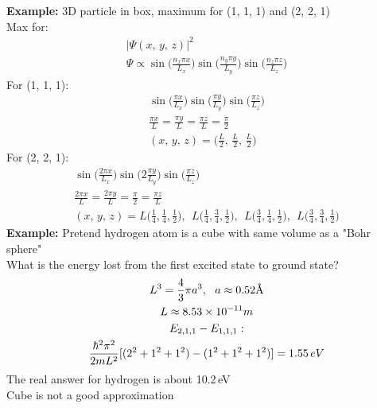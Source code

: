 \documentclass[a4paper, 11pt, fleqn, normalem]{report}
\begin{document}
\textbf{Example: }3D particle in box, maximum for (1, 1, 1) and (2, 2, 1) \\
Max for:
\begin{gather*}
    |\Psi(x,\,y,\,z)|^{2} \\
    \Psi \propto \sin\bigg(\frac{n_{x}\pi x}{L_{x}}\bigg)\sin\bigg(\frac{n_{y}\pi y}{L_{y}}\bigg)\sin\bigg(\frac{n_{z}\pi z}{L_{z}}\bigg)
\end{gather*}
For (1, 1, 1):
\begin{gather*}
    \sin\bigg(\frac{\pi x}{L_{x}}\bigg)\sin\bigg(\frac{\pi y}{L_{y}}\bigg)\sin\bigg(\frac{\pi z}{L_{z}}\bigg) \\
    \frac{\pi x}{L} = \frac{\pi y}{L} = \frac{\pi z}{L} = \frac{\pi}{2} \\
    (x,\,y,\,z) = \bigg(\frac{L}{2},\,\frac{L}{2},\,\frac{L}{2}\bigg)
\end{gather*}
For (2, 2, 1):
\begin{gather*}
    \sin\bigg(\frac{2\pi x}{L_{x}}\bigg)\sin\bigg(2\frac{\pi y}{L_{y}}\bigg)\sin\bigg(\frac{\pi z}{L_{z}}\bigg) \\
    \frac{2\pi x}{L} = \frac{2\pi y}{L} = \frac{\pi}{2} = \frac{\pi z}{L} \\
    (x,\,y,\,z) = L\bigg(\frac{1}{4},\frac{1}{4},\frac{1}{2}\bigg),~~ L\bigg(\frac{1}{4},\frac{3}{4},\frac{1}{2}\bigg),~~ L\bigg(\frac{3}{4},\frac{1}{4},\frac{1}{2}\bigg),~~
    L\bigg(\frac{3}{4},\frac{3}{4},\frac{1}{2}\bigg)
\end{gather*}
\textbf{Example: }Pretend hydrogen atom is a cube with same volume as a "Bohr sphere" \\
What is the energy lost from the first excited state to ground state?
\begin{gather*}
    L^{3} = \frac{4}{3}\pi a^{3},~~a \approx 0.52\text{\r{A}} \\
    L \approx 8.53\times10^{-11}m \\
    E_{2,1,1} - E_{1,1,1}: \\
    \frac{\hbar^{2}\pi^{2}}{2mL^{2}}[(2^{2} + 1^{2} + 1^{2}) - (1^{2} + 1^{2} + 1^{2})] = 1.55\,eV
\end{gather*}
The real answer for hydrogen is about 10.2\,eV \\
Cube is not a good approximation
\end{document}
